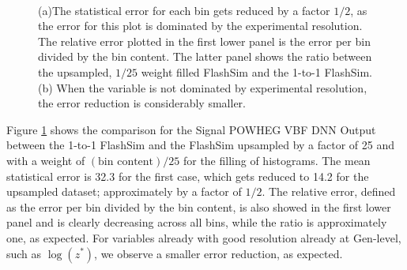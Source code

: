        \begin{figure}
       \myfloatalign
    \\
    \caption[Upsampling error reduction]{(a)The statistical error for each bin gets reduced by a factor $1/2$, as the error for this plot is dominated by the experimental resolution. The relative error plotted in the first lower panel is the error per bin divided by the bin content. The latter panel shows the ratio between the upsampled, $1/25$ weight filled FlashSim and the 1-to-1 FlashSim. (b) When the variable is not dominated by experimental resolution, the error reduction is considerably smaller.}
    \label{fig:updnnHMM}
   \end{figure}
   
   Figure \ref{fig:updnnHMM} shows the comparison for the Signal POWHEG VBF DNN Output between the 1-to-1 FlashSim and the FlashSim upsampled by a factor of 25 and with a weight of $(\text{bin content})/25$ for the filling of histograms. The mean statistical error is 32.3 for the first case, which gets reduced to 14.2 for the upsampled dataset; approximately by a factor of $1/2$. The relative error, defined as the error per bin divided by the bin content, is also showed in the first lower panel and is clearly decreasing across all bins, while the ratio is approximately one, as expected. For variables already with good resolution already at Gen-level, such as $\log(z^*)$, we observe a smaller error reduction, as expected.
   
